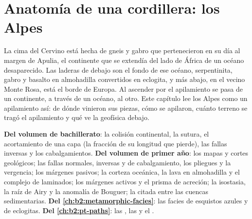 \chapter{Anatomía de una cordillera: los Alpes}\label{ch:b2:alpine-orogen}

La cima del Cervino está hecha de gneis y gabro que pertenecieron en su día al margen
de Apulia, el continente que se extendía del lado de África de un océano desaparecido. Las laderas de debajo
son el fondo de ese océano, serpentinita, gabro y basalto en almohadilla convertidos en eclogita, y
más abajo, en el vecino Monte Rosa, está el borde de Europa. Al ascender por el
apilamiento se pasa de un continente, a través de un océano, al otro. Este capítulo lee los Alpes como un apilamiento así: de dónde vinieron sus piezas, cómo se
apilaron, cuánto terreno se tragó el apilamiento y qué ve la geofísica debajo.

\begin{recall}
\textbf{Del volumen de bachillerato}: la colisión continental, la sutura, el acortamiento de una
capa (la fracción de su longitud que pierde), las fallas inversas y los cabalgamientos. \textbf{Del volumen de primer
año}: los mapas y cortes geológicos; las fallas normales, inversas y de cabalgamiento, los pliegues y
la vergencia; los márgenes pasivos; la corteza oceánica, la lava en almohadilla y el complejo de 
laminados; los márgenes activos y el prisma de acreción; la isostasia, la raíz de Airy y la anomalía de Bouguer;
la  citada entre las cuencas sedimentarias. \textbf{Del
\cref{ch:b2:metamorphic-facies}}: las facies de esquistos azules y de eclogitas. \textbf{Del
\cref{ch:b2:pt-paths}}: las , las  y el .
\end{recall}

